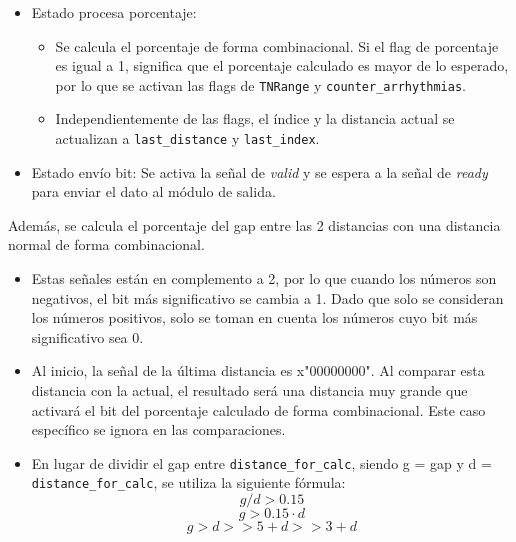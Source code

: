 \begin{itemize}
    \item Estado procesa porcentaje: 
    \begin{itemize}
        \item Se calcula el porcentaje de forma combinacional. Si el flag de porcentaje es igual a 1, significa que el porcentaje calculado es mayor de lo esperado, por lo que se activan las flags de \texttt{TNRange} y \texttt{counter\_arrhythmias}.
        \item Independientemente de las flags, el índice y la distancia actual se actualizan a \texttt{last\_distance} y \texttt{last\_index}.
    \end{itemize}
    \item Estado envío bit: Se activa la señal de \textit{valid} y se espera a la señal de \textit{ready} para enviar el dato al módulo de salida.
\end{itemize}

Además, se calcula el porcentaje del gap entre las 2 distancias con una distancia normal de forma combinacional.

\begin{itemize}
    \item Estas señales están en complemento a 2, por lo que cuando los números son negativos, el bit más significativo se cambia a 1. Dado que solo se consideran los números positivos, solo se toman en cuenta los números cuyo bit más significativo sea 0.
    \item Al inicio, la señal de la última distancia es x"00000000". Al comparar esta distancia con la actual, el resultado será una distancia muy grande que activará el bit del porcentaje calculado de forma combinacional. Este caso específico se ignora en las comparaciones.
    \item En lugar de dividir el gap entre \texttt{distance\_for\_calc},  siendo g = gap y d = \texttt{distance\_for\_calc}, se utiliza la siguiente fórmula:
    \[ g/d > 0.15\] 
    \[g > 0.15 \cdot d \] 
    \[g > d>> 5 + d>> 3 + d\] 
\end{itemize}

